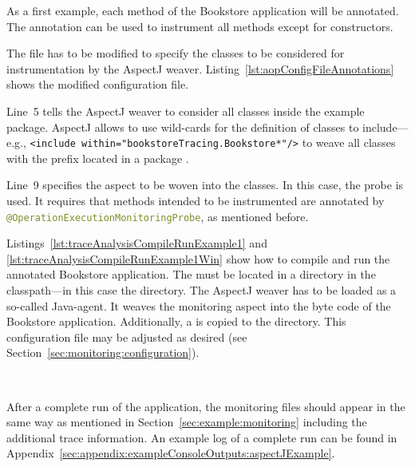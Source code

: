 \setJavaCodeListing


\noindent As a first example, each method of the Bookstore application will be annotated. The annotation can be used to instrument all methods except for constructors.

The \file{\aopConfigFile} file has to be modified to specify the classes to be considered for instrumentation by the AspectJ weaver. Listing~\ref{lst:aopConfigFileAnnotations} shows the modified configuration file.

\enlargethispage{1cm}
\setXMLListing


\noindent Line~5 tells the AspectJ weaver to consider all classes inside the example package. %
AspectJ allows to use wild-cards for the definition of classes to %
include---e.g., \lstinline$<include within="bookstoreTracing.Bookstore*"/>$ to weave all %
classes with the prefix  located in a package .

Line~9 specifies the aspect to be woven into the classes. In this case, the \Kieker{} %
probe  is used. It requires that %
methods intended to be instrumented are annotated by %
\lstinline[language=Java]{@OperationExecutionMonitoringProbe}, as mentioned before.

Listings~\ref{lst:traceAnalysisCompileRunExample1} and %
\ref{lst:traceAnalysisCompileRunExample1Win} show how to compile and run the annotated %
Bookstore application. The \file{\aopConfigFile} must be located in a %
 directory in the classpath---in this case the  directory. %
The AspectJ weaver has to be loaded as a so-called Java-agent. It weaves the %
monitoring aspect into the byte code of the Bookstore application. %
Additionally, a \file{\kiekerMonitoringProperties{}} is copied to the  directory. %
This configuration file may be adjusted as desired (see Section~\ref{sec:monitoring:configuration}).

\


\setBashListing



\noindent After a complete run of the application, the monitoring files should appear in %
the same way as mentioned in Section~\ref{sec:example:monitoring} including the %
additional trace information. An example log of a complete run can be found in %
Appendix~\ref{sec:appendix:exampleConsoleOutputs:aspectJExample}.

